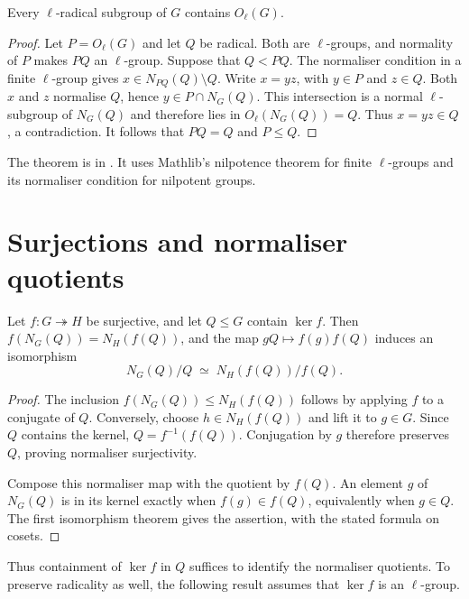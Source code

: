 \begin{proposition}
\label{lib:groups:core-contained}
Every $\ell$-radical subgroup of $G$ contains $O_\ell(G)$.
\end{proposition}
\begin{proof}
Let $P=O_\ell(G)$ and let $Q$ be radical. Both are $\ell$-groups, and
normality of $P$ makes $PQ$ an $\ell$-group. Suppose that $Q<PQ$.
The normaliser condition in a finite
$\ell$-group gives $x\in N_{PQ}(Q)\setminus Q$. Write $x=yz$, with
$y\in P$ and $z\in Q$. Both $x$ and $z$ normalise $Q$, hence
$y\in P\cap N_G(Q)$. This intersection is a normal $\ell$-subgroup of
$N_G(Q)$ and therefore lies in $O_\ell(N_G(Q))=Q$. Thus $x=yz\in Q$,
a contradiction. It follows that $PQ=Q$ and $P\leq Q$.
\end{proof}
\begin{implementation}
The theorem is  in
. It uses Mathlib's nilpotence theorem
for finite $\ell$-groups and its normaliser condition for nilpotent groups.
\end{implementation}

\section{Surjections and normaliser quotients}

\begin{proposition}
\label{lib:groups:normaliser-quotient}
Let $f:G\twoheadrightarrow H$ be surjective, and let $Q\leq G$ contain
$\ker f$. Then $f(N_G(Q))=N_H(f(Q))$, and the map $gQ\mapsto f(g)f(Q)$
induces an isomorphism
\[
 N_G(Q)/Q\;\simeq\;N_H(f(Q))/f(Q).
\]
\end{proposition}
\begin{proof}
The inclusion $f(N_G(Q))\leq N_H(f(Q))$ follows by applying $f$ to a
conjugate of $Q$. Conversely, choose $h\in N_H(f(Q))$ and lift it to
$g\in G$. Since $Q$ contains the kernel, $Q=f^{-1}(f(Q))$. Conjugation
by $g$ therefore preserves $Q$, proving normaliser surjectivity.

Compose this normaliser map with the quotient by $f(Q)$. An element $g$
of $N_G(Q)$ is in its kernel exactly when $f(g)\in f(Q)$, equivalently
when $g\in Q$. The first isomorphism theorem gives the assertion, with
the stated formula on cosets.
\end{proof}

Thus containment of $\ker f$ in $Q$ suffices to identify the normaliser
quotients. To preserve radicality as well, the following result assumes
that $\ker f$ is an $\ell$-group.

